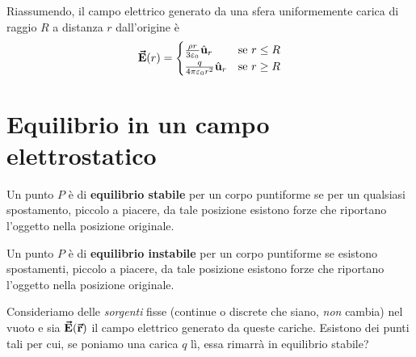 Riassumendo, il campo elettrico generato da una sfera uniformemente carica di raggio $R$ a distanza $r$ dall'origine è
\begin{equation}
	\vb*{\va{E}}(r)=\begin{cases}
		\frac{\rho r}{3\varepsilon_0}\hat{\mathbf{u}}_r&\text{se}\ r\leq R\\
		\frac{q}{4\pi\varepsilon_0 r^2}\hat{\mathbf{u}}_r &\text{se}\ r\geq R
	\end{cases}
\end{equation}
\section{Equilibrio in un campo elettrostatico}
\begin{define}
	Un punto $P$ è di \textbf{equilibrio stabile} per un corpo puntiforme se per un qualsiasi spostamento, piccolo a piacere, da tale posizione esistono forze che riportano l'oggetto nella posizione originale.
\end{define}
\begin{define}
	Un punto $P$ è di \textbf{equilibrio instabile} per un corpo puntiforme se esistono spostamenti, piccolo a piacere, da tale posizione esistono forze che riportano l'oggetto nella posizione originale.
\end{define}
Consideriamo delle \textit{sorgenti} fisse (continue o discrete che siano, \textit{non} cambia) nel vuoto e sia $\vb*{\va{E}}(\vb*{\va{r}})$ il campo elettrico generato da queste cariche. Esistono dei punti tali per cui, se poniamo una carica $q$ lì, essa rimarrà in equilibrio stabile?

